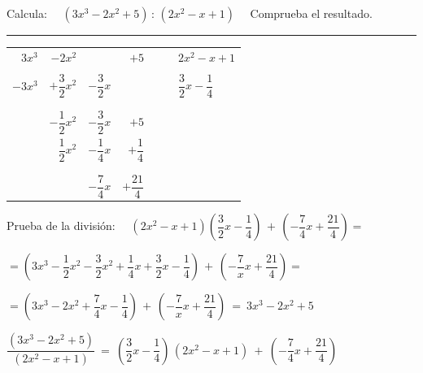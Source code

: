 \vspace{5mm}
\begin{miejercicio}

Calcula: $\quad (3x^3-2x^2+5)\, : \, (2x^2-x+1) \quad$  Comprueba el resultado.

\vspace{-2mm}
\rule{250pt}{0.1pt}	

\begin{table}[H]
\centering
\begin{tabular}{rrrrll}
$3x^3$ & $-2x^2$ &  & $+5$ & \multicolumn{1}{l|}{$\quad$} & $2x^2-x+1$ \\ \cline{6-6} \\
$-3x^3$ & $+\dfrac 3 2 x^2$ & $-\dfrac 3 2 x$ &  &  & $\dfrac 3 2 x -\dfrac 1 4$ \\  \\ \cline{1-3} \\ 
 & $-\dfrac 1 2 x^2$ & $-\dfrac 3 2 x$ & $+5$ &  &  \\
 & $\dfrac 1 2 x^2$ & $-\dfrac 1 4 x$ & $+\dfrac 1 4 $ &  &  \\ \\ \cline{2-4} \\
 &  & $-\dfrac 7 4 x$ & $+\dfrac{21}{4}$ &  & 
\end{tabular}
\end{table}


Prueba de la división: $\quad (2x^2-x+1)\left( \dfrac 3 2 x-\dfrac 1 4 \right) \, + \, \left( -\dfrac 7 4 x + \dfrac{21}4 \right)=$

$=\left( 3x^3-\dfrac 1 2 x^2 -\dfrac 3 2 x^2 +\dfrac 1 4 x + \dfrac 3 2 x-\dfrac 1 4 \right) \, + \, \left( -\dfrac 7 x x + \dfrac{21}4 \right)=$

$=\left( 3x^3-2x^2+\dfrac 7 4 x -\dfrac 1 4 \right) \, + \, \left( -\dfrac 7 x x + \dfrac{21}4 \right) \ = \ 3x^3-2x^2+5$ \textcolor{gris}{\QED}

\vspace{5mm} $ \dfrac{(3x^3-2x^2+5)}{(2x^2-x+1) } \ = \ \left( \dfrac 3 2 x -\dfrac 1 4  \right) \, (2x^2-x+1) \ + \ \left( -\dfrac 7 4 x +\dfrac {21}4 \right)$

\end{miejercicio}

